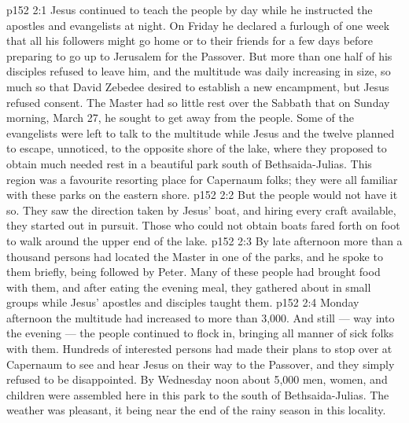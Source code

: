 \vs p152 2:1 Jesus continued to teach the people by day while he instructed the apostles and evangelists at night. On Friday he declared a furlough of one week that all his followers might go home or to their friends for a few days before preparing to go up to Jerusalem for the Passover. But more than one half of his disciples refused to leave him, and the multitude was daily increasing in size, so much so that David Zebedee desired to establish a new encampment, but Jesus refused consent. The Master had so little rest over the Sabbath that on Sunday morning, March 27, he sought to get away from the people. Some of the evangelists were left to talk to the multitude while Jesus and the twelve planned to escape, unnoticed, to the opposite shore of the lake, where they proposed to obtain much needed rest in a beautiful park south of Bethsaida\hyp{}Julias. This region was a favourite resorting place for Capernaum folks; they were all familiar with these parks on the eastern shore.
\vs p152 2:2 But the people would not have it so. They saw the direction taken by Jesus’ boat, and hiring every craft available, they started out in pursuit. Those who could not obtain boats fared forth on foot to walk around the upper end of the lake.
\vs p152 2:3 By late afternoon more than a thousand persons had located the Master in one of the parks, and he spoke to them briefly, being followed by Peter. Many of these people had brought food with them, and after eating the evening meal, they gathered about in small groups while Jesus’ apostles and disciples taught them.
\vs p152 2:4 Monday afternoon the multitude had increased to more than 3,000. And still --- way into the evening --- the people continued to flock in, bringing all manner of sick folks with them. Hundreds of interested persons had made their plans to stop over at Capernaum to see and hear Jesus on their way to the Passover, and they simply refused to be disappointed. By Wednesday noon about 5,000 men, women, and children were assembled here in this park to the south of Bethsaida\hyp{}Julias. The weather was pleasant, it being near the end of the rainy season in this locality.
